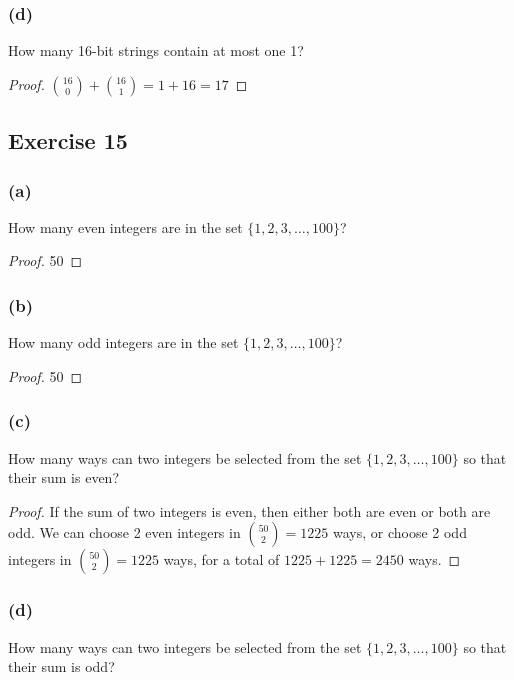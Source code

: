 \documentclass[14pt]{extarticle}
\begin{document}
\subsubsection{(d)}
How many 16-bit strings contain at most one 1?

\begin{proof}
     \(\binom{16}{0} + \binom{16}{1} = 1 + 16 = 17\)
\end{proof}

\subsection{Exercise 15}
\subsubsection{(a)}
How many even integers are in the set \(\{1, 2, 3, \ldots, 100\}\)?

\begin{proof}
     50
\end{proof}

\subsubsection{(b)}
How many odd integers are in the set \(\{1, 2, 3, \ldots, 100\}\)?

\begin{proof}
     50
\end{proof}

\subsubsection{(c)}
How many ways can two integers be selected from the set \(\{1, 2, 3, \ldots, 100\}\) so that their sum is even?

\begin{proof}
     If the sum of two integers is even, then either both are even or both are odd. We can choose 2 even integers in \(\binom{50}
     {2} = 1225\) ways, or choose 2 odd integers in \(\binom{50}{2}= 1225\) ways, for a total of \(1225 + 1225 = 2450\) ways.
\end{proof}

\subsubsection{(d)}
How many ways can two integers be selected from the set \(\{1, 2, 3, \ldots, 100\}\) so that their sum is odd?
\end{document}
